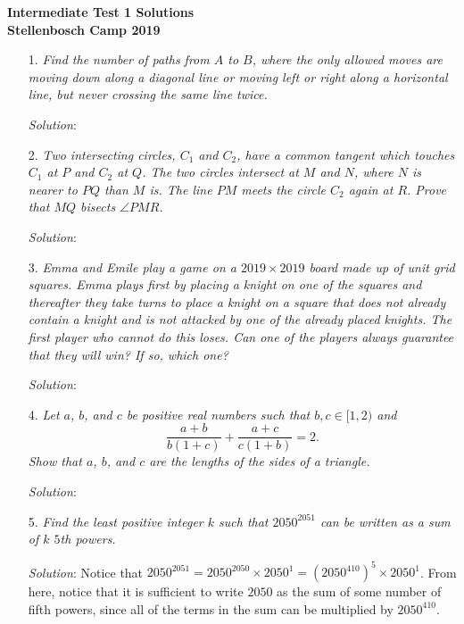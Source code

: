 \documentclass{article}
\begin{document}
\begin{center}
  \textbf{\Large Intermediate Test 1 Solutions}
  \\ \vspace{1em}
  \textbf{\large Stellenbosch Camp 2019}
\end{center}


\begin{enumerate}[1.]

\item[1.] %
\textit{Find the number of paths from $A$ to $B$, where the only allowed moves are moving down along a diagonal line or moving left or right along a horizontal line, but never crossing the same line twice.}

\textit{Solution}:


\item[2.] %
\textit{Two intersecting circles, $C_1$ and $C_2$, have a common tangent which touches $C_1$ at $P$ and $C_2$ at $Q$. The two circles intersect at $M$ and $N$, where $N$ is nearer to $PQ$ than $M$ is. The line $PM$ meets the circle $C_2$ again at $R$. Prove that $MQ$ bisects $\angle PMR$.}

\textit{Solution}:


\item[3.] %
\textit{Emma and Emile play a game on a $2019 \times 2019$ board made up of unit grid squares. Emma plays first by placing a knight on one of the squares and thereafter they take turns to place a knight on a square that does not already contain a knight and is not attacked by one of the already placed knights. The first player who cannot do this loses. Can one of the players always guarantee that they will win? If so, which one? }

\textit{Solution}:


\item[4.] %
\textit{Let $a$, $b$, and $c$ be positive real numbers such that $b, c \in [1,2)$ and
\[ \frac{a+b}{b(1+c)} +\frac{a+c}{c(1+b)} = 2. \]
Show that $a$, $b$, and $c$ are the lengths of the sides of a triangle.}

\textit{Solution}:


\item[5.] %
\textit{Find the least positive integer $k$ such that $2050^{2051}$ can be written as a sum of $k$ $5$th powers.}

\textit{Solution}: 
Notice that $2050^{2051} = 2050^{2050} \times 2050^{1} = (2050^{410})^{5} \times 2050^{1}$. From here, notice that it is sufficient to write $2050$ as the sum of some number of fifth powers, since all of the terms in the sum can be multiplied by $2050^{410}$.


\end{enumerate}
\end{document}
